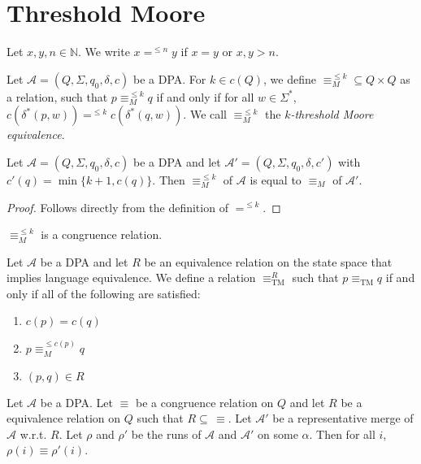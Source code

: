 \section{Threshold Moore}
\begin{defn}
	Let $x, y, n \in \mathbb{N}$. We write $x =^{\leq n} y$ if $x = y$ or $x, y > n$.

	Let $\mathcal{A} = (Q, \Sigma, q_0, \delta, c)$ be a DPA. For $k \in c(Q)$, we define $\equiv_M^{\leq k} \subseteq Q \times Q$ as a relation, such that $p \equiv_M^{\leq k} q$ if and only if for all $w \in \Sigma^*$, $c(\delta^*(p, w)) =^{\leq k} c(\delta^*(q, w))$. We call $\equiv_M^{\leq k}$ the \emph{$k$-threshold Moore equivalence}.
\end{defn}

\begin{lem}
	Let $\mathcal{A} = (Q, \Sigma, q_0, \delta, c)$ be a DPA and let $\mathcal{A}' = (Q, \Sigma, q_0, \delta, c')$ with $c'(q) = \min \{k+1, c(q)\}$. Then $\equiv_M^{\leq k}$ of $\mathcal{A}$ is equal to $\equiv_M$ of $\mathcal{A}'$.
	\label{lem:tremoore:mleq_is_actually_just_moore}
\end{lem}

\begin{proof}
	Follows directly from the definition of $=^{\leq k}$.
\end{proof}

\begin{cor}
	$\equiv_M^{\leq k}$ is a congruence relation.
\end{cor}

\begin{defn}
	Let $\mathcal{A}$ be a DPA and let $R$ be an equivalence relation on the state space that implies language equivalence. We define a relation $\equiv_\text{TM}^R$ such that $p \equiv_\text{TM} q$ if and only if all of the following are satisfied:
	\begin{enumerate}
		\item $c(p) = c(q)$
		\item $p \equiv_M^{\leq c(p)} q$
		\item $(p, q) \in R$
	\end{enumerate}
\end{defn}

\begin{lem}
	Let $\mathcal{A}$ be a DPA. Let $\equiv$ be a congruence relation on $Q$ and let $R$ be a equivalence relation on $Q$ such that $R \subseteq\, \equiv$. Let $\mathcal{A}'$ be a representative merge of $\mathcal{A}$ w.r.t. $R$. Let $\rho$ and $\rho'$ be the runs of $\mathcal{A}$ and $\mathcal{A}'$ on some $\alpha$. Then for all $i$, $\rho(i) \equiv \rho'(i)$.
	\label{lem:tremoore:cong_stays_in_merge}
\end{lem}

